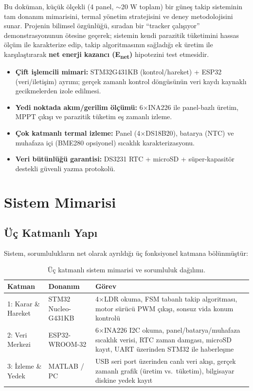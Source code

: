 \documentclass[11pt,a4paper]{article}
\begin{document}
Bu doküman, küçük ölçekli (4 panel, $\sim$20 W toplam) bir güneş takip sisteminin tam donanım mimarisini, termal yönetim stratejisini ve deney metodolojisini sunar. Projenin bilimsel özgünlüğü, sıradan bir ``tracker çalışıyor'' demonstrasyonunun ötesine geçerek; sistemin kendi parazitik tüketimini hassas ölçüm ile karakterize edip, takip algoritmasının sağladığı ek üretim ile karşılaştırarak \textbf{net enerji kazancı (E\textsubscript{net})} hipotezini test etmesidir.

\begin{infobox}
\begin{itemize}
    \item \textbf{Çift işlemcili mimari:} STM32G431KB (kontrol/hareket) + ESP32 (veri/iletişim) ayrımı; gerçek zamanlı kontrol döngüsünün veri kaydı kaynaklı gecikmelerden izole edilmesi.
    \item \textbf{Yedi noktada akım/gerilim ölçümü:} 6$\times$INA226 ile panel-bazlı üretim, MPPT çıkışı ve parazitik tüketim eş zamanlı izleme.
    \item \textbf{Çok katmanlı termal izleme:} Panel (4$\times$DS18B20), batarya (NTC) ve muhafaza içi (BME280 opsiyonel) sıcaklık karakterizasyonu.
    \item \textbf{Veri bütünlüğü garantisi:} DS3231 RTC + microSD + süper-kapasitör destekli güvenli yazma protokolü.
\end{itemize}
\end{infobox}

\section{Sistem Mimarisi}

\subsection{Üç Katmanlı Yapı}

Sistem, sorumlulukların net olarak ayrıldığı üç fonksiyonel katmana bölünmüştür:

\begin{table}[h]
\centering
\renewcommand{\arraystretch}{1.3}
\begin{tabular}{|p{3cm}|p{4cm}|p{7cm}|}
\hline
\rowcolor{primary!15}
\textbf{Katman} & \textbf{Donanım} & \textbf{Görev} \\
\hline
1: Karar \& Hareket & STM32 Nucleo-G431KB & 4$\times$LDR okuma, FSM tabanlı takip algoritması, motor sürücü PWM çıkışı, sonsuz vida konum kontrolü \\
\hline
2: Veri Merkezi & ESP32-WROOM-32 & 6$\times$INA226 I2C okuma, panel/batarya/muhafaza sıcaklık verisi, RTC zaman damgası, microSD kayıt, UART üzerinden STM32 ile haberleşme \\
\hline
3: İzleme \& Yedek & MATLAB / PC & USB seri port üzerinden canlı veri akışı, gerçek zamanlı grafik (üretim vs.\ tüketim), bilgisayar diskine yedek kayıt \\
\hline
\end{tabular}
\caption{Üç katmanlı sistem mimarisi ve sorumluluk dağılımı.}
\end{table}
\end{document}
